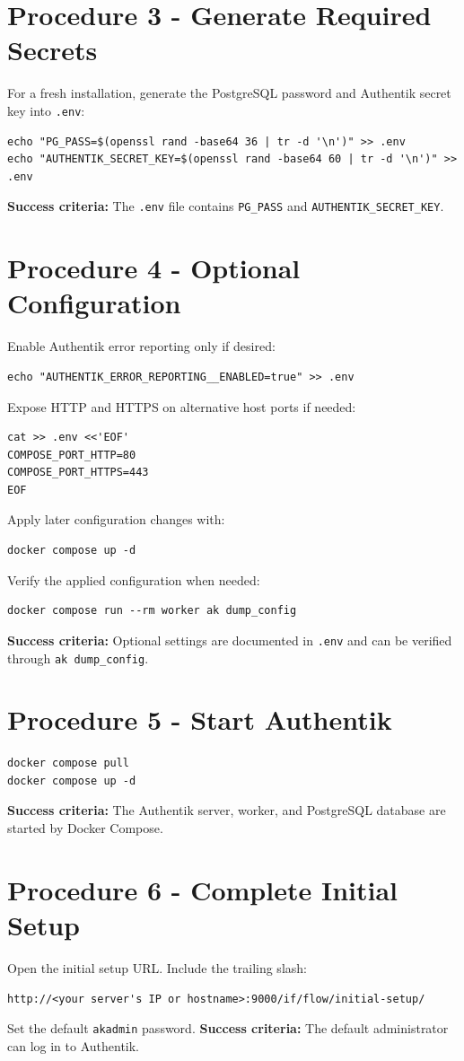 \documentclass[11pt]{article}
\newcommand{\ok}{\textbf{Success criteria:} }
\begin{document}
\section*{Procedure 3 - Generate Required Secrets}
For a fresh installation, generate the PostgreSQL password and Authentik secret key into \texttt{.env}:
\begin{verbatim}
echo "PG_PASS=$(openssl rand -base64 36 | tr -d '\n')" >> .env
echo "AUTHENTIK_SECRET_KEY=$(openssl rand -base64 60 | tr -d '\n')" >> .env
\end{verbatim}
\ok The \texttt{.env} file contains \texttt{PG\_PASS} and \texttt{AUTHENTIK\_SECRET\_KEY}.

\section*{Procedure 4 - Optional Configuration}
Enable Authentik error reporting only if desired:
\begin{verbatim}
echo "AUTHENTIK_ERROR_REPORTING__ENABLED=true" >> .env
\end{verbatim}
Expose HTTP and HTTPS on alternative host ports if needed:
\begin{verbatim}
cat >> .env <<'EOF'
COMPOSE_PORT_HTTP=80
COMPOSE_PORT_HTTPS=443
EOF
\end{verbatim}
Apply later configuration changes with:
\begin{verbatim}
docker compose up -d
\end{verbatim}
Verify the applied configuration when needed:
\begin{verbatim}
docker compose run --rm worker ak dump_config
\end{verbatim}
\ok Optional settings are documented in \texttt{.env} and can be verified through \texttt{ak dump\_config}.

\section*{Procedure 5 - Start Authentik}
\begin{verbatim}
docker compose pull
docker compose up -d
\end{verbatim}
\ok The Authentik server, worker, and PostgreSQL database are started by Docker Compose.

\section*{Procedure 6 - Complete Initial Setup}
Open the initial setup URL. Include the trailing slash:
\begin{verbatim}
http://<your server's IP or hostname>:9000/if/flow/initial-setup/
\end{verbatim}
Set the default \texttt{akadmin} password.
\ok The default administrator can log in to Authentik.
\end{document}
